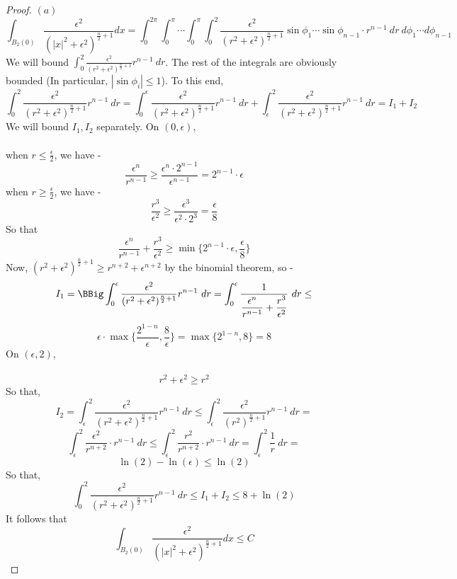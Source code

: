 \documentclass[12pt]{article}
\begin{document}
\begin{proof}
  $(a)$
  $$
    \int_{B_2(0)} \dfrac{\epsilon^2}{(|x|^2+\epsilon^2)^{\frac{n}{2}+1}} dx =
    \int_0^{2\pi} \int_0^\pi \cdots \int_0^\pi \int_0^2 \dfrac{\epsilon^2}{(r^2+\epsilon^2)^{\frac{n}{2}+1}} \sin\phi_1 \cdots \sin\phi_{n-1} \cdot r^{n-1}\ dr\ d\phi_1 \cdots d\phi_{n-1}
  $$
  We will bound $\int_0^2 \frac{\epsilon^2}{(r^2+\epsilon^2)^{\frac{n}{2}+1}} r^{n-1}\ dr$. The rest of the integrals are obviously bounded (In particular, $|\sin \phi_i| \le 1$). To this end,
  $$
    \int_0^2 \frac{\epsilon^2}{(r^2+\epsilon^2)^{\frac{n}{2}+1}} r^{n-1}\ dr =
    \int_0^\epsilon \frac{\epsilon^2}{(r^2+\epsilon^2)^{\frac{n}{2}+1}} r^{n-1}\ dr +
    \int_\epsilon^2 \frac{\epsilon^2}{(r^2+\epsilon^2)^{\frac{n}{2}+1}} r^{n-1}\ dr =
    I_1 + I_2
  $$
  We will bound $I_1, I_2$ separately. On $(0, \epsilon)$,
  \\
  \\
  when $r \le \frac{\epsilon}{2}$, we have -
  $$
    \dfrac{\epsilon^n}{r^{n-1}} \ge
    \dfrac{\epsilon^n \cdot 2^{n-1}}{\epsilon^{n-1}} =
    2^{n-1} \cdot \epsilon
  $$
  when $r \ge \frac{\epsilon}{2}$, we have -
  $$
    \dfrac{r^3}{\epsilon^2} \ge
    \dfrac{\epsilon^3}{\epsilon^2 \cdot  2^3} =
    \dfrac{\epsilon}{8}
  $$
  So that
  $$
    \dfrac{\epsilon^n}{r^{n-1}} + \dfrac{r^3}{\epsilon^2} \ge
    \min\{2^{n-1} \cdot \epsilon, \dfrac{\epsilon}{8}\}
  $$
  Now, $(r^2+\epsilon^2)^{\frac{n}{2}+1} \ge r^{n+2} + \epsilon^{n+2}$ by the binomial theorem, so -
  $$
    I_1 = \BBig\int_0^\epsilon \frac{\epsilon^2}{(r^2+\epsilon^2)^{\frac{n}{2}+1}} r^{n-1}\ dr =
    \int_0^\epsilon \frac{1}{\dfrac{\epsilon^n}{r^{n-1}} + \dfrac{r^3}{\epsilon^2}}\ dr \le
  $$
  $$
    \epsilon \cdot \max\{ \frac{2^{1-n}}{\epsilon}, \frac{8}{\epsilon} \} =
    \max\{ 2^{1-n}, 8 \} =
    8
  $$
  On $(\epsilon, 2)$,
  \\
  \\
  $$
    r^2 + \epsilon^2 \ge
    r^2
  $$
  So that,
  $$
    I_2 =
    \int_\epsilon^2 \frac{\epsilon^2}{(r^2+\epsilon^2)^{\frac{n}{2}+1}} r^{n-1}\ dr \le
    \int_\epsilon^2 \frac{\epsilon^2}{(r^2)^{\frac{n}{2}+1}} r^{n-1}\ dr =
  $$
  $$
    \int_\epsilon^2 \frac{\epsilon^2}{r^{n+2}} \cdot r^{n-1}\ dr \le
    \int_\epsilon^2 \frac{r^2}{r^{n+2}} \cdot r^{n-1}\ dr =
    \int_\epsilon^2 \frac{1}{r}\ dr =
  $$
  $$
    \ln(2) - \ln(\epsilon) \le
    \ln(2)
  $$
  So that,
  $$
    \int_0^2 \frac{\epsilon^2}{(r^2+\epsilon^2)^{\frac{n}{2}+1}} r^{n-1}\ dr \le
    I_1 + I_2 \le
    8 + \ln(2)
  $$
  It follows that
  $$
    \int_{B_2(0)} \dfrac{\epsilon^2}{(|x|^2+\epsilon^2)^{\frac{n}{2}+1}} dx \le
    C
  $$
\end{proof}
\end{document}
